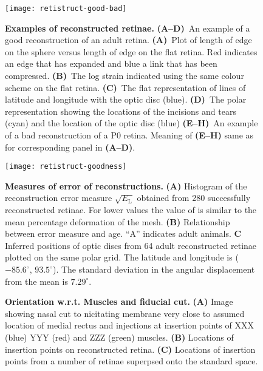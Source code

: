 \documentclass[10pt]{article}
\begin{document}
\begin{figure}[!ht]
  \centering
  \texttt{[image: retistruct-good-bad]}

  \caption{\textbf{Examples of reconstructed retinae.}
    \textbf{(A--D)}~An example of a good reconstruction of an adult
    retina.  \textbf{(A)}~Plot of length of edge on the sphere versus
    length of edge on the flat retina. Red indicates an edge that has
    expanded and blue a link that has been compressed.
    \textbf{(B)}~The log strain indicated using the same colour scheme
    on the flat retina. \textbf{(C)}~The flat representation of lines
    of latitude and longitude with the optic disc
    (blue). \textbf{(D)}~The polar representation showing the
    locations of the incisions and tears (cyan) and the location of
    the optic disc (blue) \textbf{(E--H)}~An example of a bad
    reconstruction of a P0 retina. Meaning of \textbf{(E--H)} same as
    for corresponding panel in \textbf{(A--D)}. }
  \label{retistruct_plos:fig:examples}
\end{figure}

\begin{figure}[!ht]
  \centering
  \texttt{[image: retistruct-goodness]}
  \caption{\textbf{Measures of error of reconstructions.}
    \textbf{(A)} Histogram of the reconstruction error measure
    $\sqrt{E_{\mathrm{L}}}$ obtained from 280 successfully reconstructed
    retinae. For lower values the value of is similar to the mean
    percentage deformation of the mesh. \textbf{(B)} Relationship
    between error measure and age. ``A'' indicates adult
    animals. \textbf{C} Inferred positions of optic discs from 64
    adult reconstructed retinae plotted on the same polar grid. The
    latitude and longitude is ($-85.6^\circ$, $93.5^\circ$). The
    standard deviation in the angular displacement from the mean is
    $7.29^\circ$. }
  \label{retistruct_plos:fig:summary}
\end{figure}

\begin{figure}[!ht]
  \centering
  
  \caption{\textbf{Orientation w.r.t. Muscles and fiducial cut.}
    \textbf{(A)} Image showing nasal cut to nicitating membrane very
    close to assumed location of medial rectus and injections at
    insertion points of XXX (blue) YYY (red) and ZZZ (green)
    muscles. \textbf{(B)} Locations of insertion points on
    reconstructed retina. \textbf{(C)} Locations of insertion points
    from a number of retinae superpsed onto the standard space. }
  \label{retistruct_plos:fig:orientation}
\end{figure}
\end{document}
